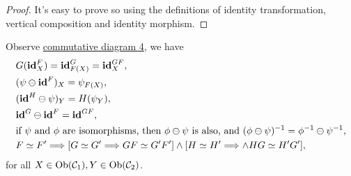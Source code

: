 \documentclass{article}
\begin{document}
\begin{proof}
	 It's easy to prove so using the definitions of identity transformation, vertical composition and identity morphism.
\end{proof}


\begin{lmm}
	Observe \hyperref[ass]{commutative diagram 4}, we have
	\begin{align}
		& G(\tid^F_X)=\tid^G_{F(X)}=\tid^{GF}_X,\label{0}\\
		& (\psi\ominus\tid^F)_X=\psi_{F(X)},\label{1}\\
		& (\tid^H\ominus\psi)_Y=H(\psi_Y),\label{2}\\
		& \tid^G\ominus\tid^F=\tid^{GF},\label{3}\\
		& \text{if\ }\psi\text{\ and\ }\phi\text{\ are\ isomorphisms,\ then\ }\phi\ominus\psi\text{\ is\ also,\ and\ }(\phi\ominus\psi)\iv=\phi\iv\ominus\psi\iv,\label{4}\\
		& F\simeq F'\Longrightarrow[G\simeq G'\Longrightarrow GF\simeq G'F']\wedge[H\simeq H'\Longrightarrow\wedge HG\simeq H'G'],\label{5}
	\end{align}
	for all $X\in\mathrm{Ob}(\mathcal{C}_1),Y\in\mathrm{Ob}(\mathcal{C}_2)$.
\end{lmm}
\end{document}
